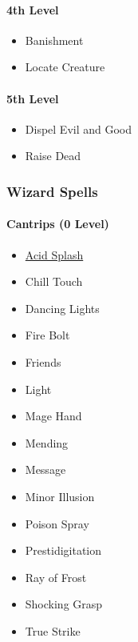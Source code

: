 \paragraph{4th Level}\label{_4th_level_2}

\begin{itemize}
\item
  Banishment
\item
  Locate Creature
\end{itemize}

\paragraph{5th Level}\label{_5th_level_2}

\begin{itemize}
\item
  Dispel Evil and Good
\item
  Raise Dead
\end{itemize}

\subsubsection{Wizard Spells}\label{spell-list-wizard}

\paragraph{Cantrips (0 Level)}\label{_cantrips_0_level_2}

\begin{itemize}
\item
  \hyperref[spell-acid-splash]{Acid Splash}
\item
  Chill Touch
\item
  Dancing Lights
\item
  Fire Bolt
\item
  Friends
\item
  Light
\item
  Mage Hand
\item
  Mending
\item
  Message
\item
  Minor Illusion
\item
  Poison Spray
\item
  Prestidigitation
\item
  Ray of Frost
\item
  Shocking Grasp
\item
  True Strike
\end{itemize}


